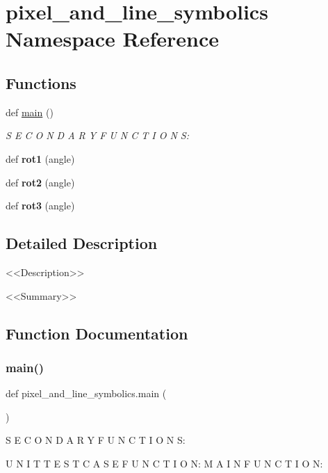 \hypertarget{namespacepixel__and__line__symbolics}{}\section{pixel\+\_\+and\+\_\+line\+\_\+symbolics Namespace Reference}
\label{namespacepixel__and__line__symbolics}
\subsection*{Functions}
\begin{DoxyCompactItemize}
\item 
def \hyperlink{namespacepixel__and__line__symbolics_a5ccb9d096c3ef95ab693c9a06b16837c}{main} ()
\begin{DoxyCompactList}\small\item\em S E C O N D A R Y F U N C T I O N S\+: \end{DoxyCompactList}\item 
\mbox{\label{namespacepixel__and__line__symbolics_afab719584860ae3b579e6719f510da4c}} 
def {\bfseries rot1} (angle)
\item 
\mbox{\label{namespacepixel__and__line__symbolics_ad41533f7e3e1cebc672f4ac1c0dd7edc}} 
def {\bfseries rot2} (angle)
\item 
\mbox{\label{namespacepixel__and__line__symbolics_a977363380135a5c5ba1b5b159be577e4}} 
def {\bfseries rot3} (angle)
\end{DoxyCompactItemize}


\subsection{Detailed Description}
\begin{DoxyVerb} <<Description>>


 <<Summary>>\end{DoxyVerb}
 

\subsection{Function Documentation}
\mbox{\label{namespacepixel__and__line__symbolics_a5ccb9d096c3ef95ab693c9a06b16837c}} 
\subsubsection{\texorpdfstring{main()}{main()}}
{\footnotesize\ttfamily def pixel\+\_\+and\+\_\+line\+\_\+symbolics.\+main (\begin{DoxyParamCaption}{ }\end{DoxyParamCaption})}



S E C O N D A R Y F U N C T I O N S\+: 

U N I T T E S T C A S E F U N C T I O N\+: M A I N F U N C T I O N\+: 